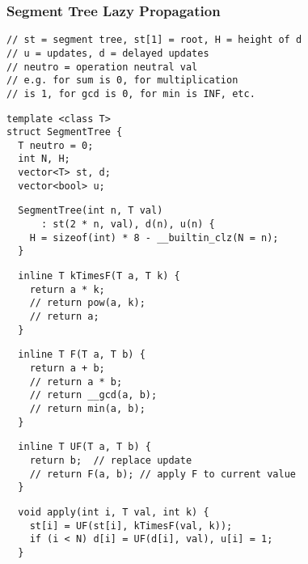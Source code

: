 \documentclass[twoside]{article}
\begin{document}
\begin{multicols*}{2}
\subsubsectionfont{\large\bfseries\sffamily\underline}
\subsubsection*{Segment Tree Lazy Propagation}
\begin{verbatim}
// st = segment tree, st[1] = root, H = height of d
// u = updates, d = delayed updates
// neutro = operation neutral val
// e.g. for sum is 0, for multiplication
// is 1, for gcd is 0, for min is INF, etc.
\end{verbatim}
\vspace{-12pt}
\begin{verbatim}
template <class T>
struct SegmentTree {
  T neutro = 0;
  int N, H;
  vector<T> st, d;
  vector<bool> u;
\end{verbatim}
\vspace{-12pt}
\begin{verbatim}
  SegmentTree(int n, T val)
      : st(2 * n, val), d(n), u(n) {
    H = sizeof(int) * 8 - __builtin_clz(N = n);
  }
\end{verbatim}
\vspace{-12pt}
\begin{verbatim}
  inline T kTimesF(T a, T k) {
    return a * k;
    // return pow(a, k);
    // return a;
  }
\end{verbatim}
\vspace{-12pt}
\begin{verbatim}
  inline T F(T a, T b) {
    return a + b;
    // return a * b;
    // return __gcd(a, b);
    // return min(a, b);
  }
\end{verbatim}
\vspace{-12pt}
\begin{verbatim}
  inline T UF(T a, T b) {
    return b;  // replace update
    // return F(a, b); // apply F to current value
  }
\end{verbatim}
\vspace{-12pt}
\begin{verbatim}
  void apply(int i, T val, int k) {
    st[i] = UF(st[i], kTimesF(val, k));
    if (i < N) d[i] = UF(d[i], val), u[i] = 1;
  }
\end{verbatim}
\vspace{-12pt}

\end{multicols*}
\end{document}
